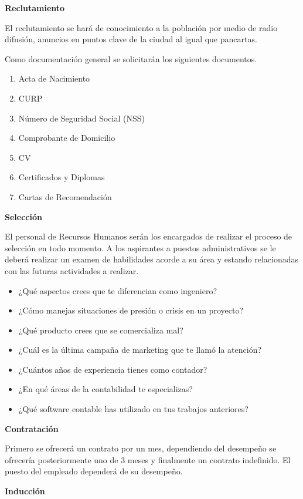 \textbf{Reclutamiento}

El reclutamiento se hará de conocimiento a la población por medio de radio difusión, anuncios en puntos clave de la ciudad al igual que pancartas.

Como documentación general se solicitarán los siguientes documentos.

\begin{enumerate}
    \item Acta de Nacimiento
    \item CURP
    \item Número de Seguridad Social (NSS)
    \item Comprobante de Domicilio
    \item CV
    \item Certificados y Diplomas
    \item Cartas de Recomendación
\end{enumerate}

\textbf{Selección}

El personal de Recursos Humanos serán los encargados de realizar el proceso de selección en todo momento. A los aspirantes a puestos administrativos se le deberá realizar un examen de habilidades acorde a su área y estando relacionadas con las futuras actividades a realizar.

\begin{itemize}
    \item ¿Qué aspectos crees que te diferencian como ingeniero?
    \item ¿Cómo manejas situaciones de presión o crisis en un proyecto?
    \item ¿Qué producto crees que se comercializa mal?
    \item ¿Cuál es la última campaña de marketing que te llamó la atención?
    \item ¿Cuántos años de experiencia tienes como contador?
    \item ¿En qué áreas de la contabilidad te especializas?
    \item ¿Qué software contable has utilizado en tus trabajos anteriores?
\end{itemize}

\textbf{Contratación}

Primero se ofrecerá un contrato por un mes, dependiendo del desempeño se ofrecería posteriormente uno de 3 meses y finalmente un contrato indefinido. El puesto del empleado dependerá de su desempeño.

\textbf{Inducción}

